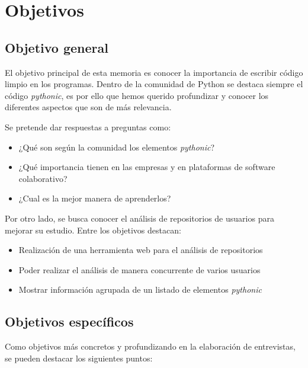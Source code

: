 \documentclass[a4paper, 12pt]{book}
\begin{document}
\cleardoublepage %
\chapter{Objetivos} %
\label{chap:objetivos} %

\section{Objetivo general} %
\label{sec:objetivo-general} %

El objetivo principal de esta memoria es conocer la importancia de escribir código limpio en los programas. Dentro de la comunidad de Python se destaca siempre el código \textit{pythonic}, es por ello que hemos querido profundizar y conocer los diferentes aspectos que son de más relevancia.

Se pretende dar respuestas a preguntas como:

\begin{itemize}
    \item ¿Qué son según la comunidad los elementos \textit{pythonic}?
    \item ¿Qué importancia tienen en las empresas y en plataformas de software colaborativo?
    \item ¿Cual es la mejor manera de aprenderlos?
\end{itemize}

Por otro lado, se busca conocer el análisis de repositorios de usuarios para mejorar su estudio. Entre los objetivos destacan:
\begin{itemize}
    \item Realización de una herramienta web para el análisis de repositorios
    \item Poder realizar el análisis de manera concurrente de varios usuarios
    \item Mostrar información agrupada de un listado de elementos \textit{pythonic}
\end{itemize}


\section{Objetivos específicos}
\label{sec:objetivos-especificos}

Como objetivos más concretos y profundizando en la elaboración de entrevistas, se pueden destacar los siguientes puntos:
\end{document}
